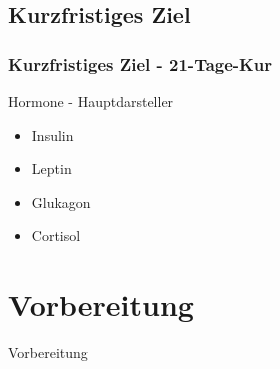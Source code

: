 \documentclass[xcolor=dvipsnames]{beamer}
\begin{document}
    \subsection{Kurzfristiges Ziel}
    \begin{frame}
        \frametitle{Kurzfristiges Ziel - 21-Tage-Kur}

        \begin{block}{Hormone - Hauptdarsteller}
            \begin{itemize}
                \setlength\itemsep{1em}
                \item Insulin
                \item Leptin
                \item Glukagon
                \item Cortisol
            \end{itemize}
        \end{block}
    \end{frame}

    \section{Vorbereitung}
    {
    \begin{frame}
        \begin{center}
            \Huge Vorbereitung
        \end{center}
    \end{frame}
    }
\end{document}
